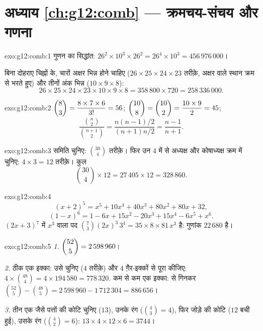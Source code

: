 \section*{अध्याय \ref{ch:g12:comb} --- क्रमचय-संचय और गणना}

\begin{solution}{exo:g12:comb:1}
गुणन का सिद्धांत: $26^2 \times 10^3 \times 26^2 = 26^4 \times 10^3 = 456\,976\,000$।

बिना दोहराए चिह्नों के, चारों अक्षर भिन्न होने चाहिए ($26 \times 25 \times 24 \times 23$ तरीक़े, अक्षर वाले
स्थान क्रम से भरते हुए) और तीनों अंक भिन्न ($10 \times 9 \times 8$):
\[
26 \times 25 \times 24 \times 23 \times 10 \times 9 \times 8
= 358\,800 \times 720 = 258\,336\,000 .
\]
\end{solution}

\begin{solution}{exo:g12:comb:2}
$\dbinom83 = \dfrac{8 \times 7 \times 6}{3!} = 56$; $\dbinom{10}{8} = \dbinom{10}{2} = \dfrac{10 \times 9}{2} = 45$; \[
\frac{\binom n2}{\binom{n+1}2}
= \frac{n(n-1)/2}{(n+1)n/2} = \frac{n-1}{n+1}.
\]
\end{solution}

\begin{solution}{exo:g12:comb:3}
समिति चुनिए: $\binom{30}{4}$ तरीक़े। फिर उन 4 में से अध्यक्ष और कोषाध्यक्ष क्रम में
चुनिए: $4 \times 3 = 12$ तरीक़े। कुल
\[
\binom{30}{4} \times 12 = 27\,405 \times 12 = 328\,860 .
\]
\end{solution}

\begin{solution}{exo:g12:comb:4}
\[
(x+2)^5 = x^5 + 10x^4 + 40x^3 + 80x^2 + 80x + 32 ,
\]
\[
(1-x)^6 = 1 - 6x + 15x^2 - 20x^3 + 15x^4 - 6x^5 + x^6 .
\]
$(2x+3)^7$ में $x^3$ वाला पद $\binom{7}{3}(2x)^3\,3^4 = 35 \times 8 \times 81\, x^3$ है: गुणांक $22\,680$ है।
\end{solution}

\begin{solution}{exo:g12:comb:5}
\emph{1.} $\dbinom{52}{5} = 2\,598\,960$।

\emph{2.} ठीक एक इक्का: उसे चुनिए ($4$ तरीक़े) और $4$ ग़ैर-इक्कों से पूरा
कीजिए: $4 \times \binom{48}{4} = 4 \times 194\,580 = 778\,320$. कम से कम एक इक्का:  से गिनकर $\binom{52}{5} - \binom{48}{5} = 2\,598\,960 - 1\,712\,304 = 886\,656$।

\emph{3.} तीन एक जैसे पत्तों की कोटि चुनिए ($13$), उनके रंग ($\binom43 = 4$), फिर जोड़े
की कोटि ($12$ बची हुई), उसके रंग ($\binom42 = 6$): $13 \times 4 \times 12 \times 6 = 3744$।
\end{solution}


